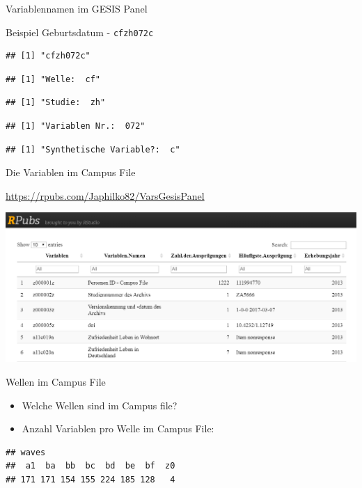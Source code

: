 \documentclass[ignorenonframetext,]{beamer}
\providecommand{\tightlist}{%
  \setlength{\itemsep}{0pt}\setlength{\parskip}{0pt}}
\begin{document}
\begin{frame}[fragile]{Variablennamen im GESIS Panel}

\begin{block}{Beispiel Geburtsdatum - \texttt{cfzh072c}}

\begin{verbatim}
## [1] "cfzh072c"
\end{verbatim}

\begin{verbatim}
## [1] "Welle:  cf"
\end{verbatim}

\begin{verbatim}
## [1] "Studie:  zh"
\end{verbatim}

\begin{verbatim}
## [1] "Variablen Nr.:  072"
\end{verbatim}

\begin{verbatim}
## [1] "Synthetische Variable?:  c"
\end{verbatim}

\end{block}

\end{frame}

\begin{frame}{Die Variablen im Campus File}

\url{https://rpubs.com/Japhilko82/VarsGesisPanel}

\includegraphics{figure/rpubs_varspuf.PNG}

\end{frame}

\begin{frame}[fragile]{Wellen im Campus File}

\begin{itemize}
\tightlist
\item
  Welche Wellen sind im Campus file?
\item
  Anzahl Variablen pro Welle im Campus File:
\end{itemize}

\begin{verbatim}
## waves
##  a1  ba  bb  bc  bd  be  bf  z0 
## 171 171 154 155 224 185 128   4
\end{verbatim}

\end{frame}
\end{document}
